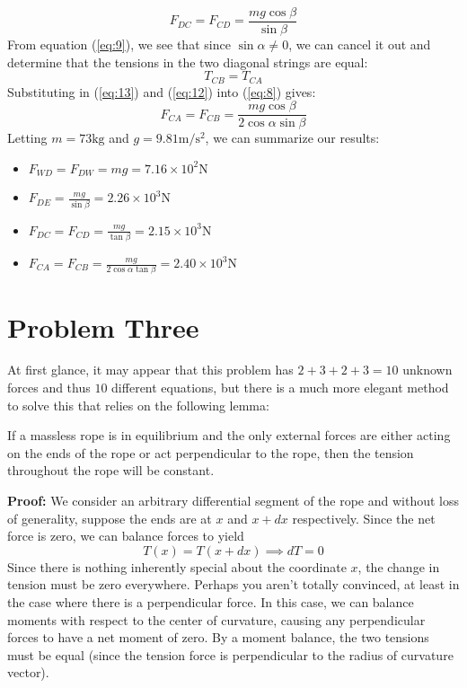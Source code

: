 \documentclass{article}
\begin{document}
\begin{equation}
    \boxed{F_{DC}=F_{CD}=\frac{mg\cos\beta}{\sin\beta}}
    \label{eq:12}
\end{equation}
From equation (\ref{eq:9}), we see that since $\sin\alpha\neq 0$, we can cancel it out and determine that the tensions in the two diagonal strings are equal:
\begin{equation}
    T_{CB}=T_{CA}
    \label{eq:13}
\end{equation}
Substituting in (\ref{eq:13}) and (\ref{eq:12}) into (\ref{eq:8}) gives:
\begin{equation}
    \boxed{F_{CA}=F_{CB}=\frac{mg\cos\beta}{2\cos\alpha\sin\beta}}
    \label{eq:14}
\end{equation}
Letting $m=73 \si{\kilogram}$ and $g=9.81\si{\meter\per\second\squared}$, we can summarize our results:
\begin{itemize}
    \item $\displaystyle F_{WD}=F_{DW}=mg=7.16 \times 10^2 \si{\newton}$
    \item $\displaystyle F_{DE}=\frac{mg}{\sin\beta}=2.26 \times 10^3 \si{\newton}$
    \item $\displaystyle F_{DC}=F_{CD}=\frac{mg}{\tan\beta}=2.15 \times 10^3 \si{\newton}$
    \item $\displaystyle F_{CA}=F_{CB}=\frac{mg}{2\cos\alpha\tan\beta}=2.40 \times 10^3 \si{\newton}$
\end{itemize}

\newpage
\section{Problem Three}
At first glance, it may appear that this problem has $2+3+2+3=10$ unknown forces and thus $10$ different equations, but there is a much more elegant method to solve this that relies on the following lemma:
\begin{lemma}
    If a massless rope is in equilibrium and the only external forces are either acting on the ends of the rope or act perpendicular to the rope, then the tension throughout the rope will be constant. 
\end{lemma}
\textbf{Proof:} We consider an arbitrary differential segment of the rope and without loss of generality, suppose the ends are at $x$ and $x+dx$ respectively. Since the net force is zero, we can balance forces to yield
\begin{equation}
    T(x)=T(x+dx) \implies dT=0
    \label{eq:}
\end{equation}
Since there is nothing inherently special about the coordinate $x$, the change in tension must be zero everywhere. Perhaps you aren't totally convinced, at least in the case where there is a perpendicular force. In this case, we can balance moments with respect to the center of curvature, causing any perpendicular forces to have a net moment of zero. By a moment balance, the two tensions must be equal (since the tension force is perpendicular to the radius of curvature vector).
\end{document}
